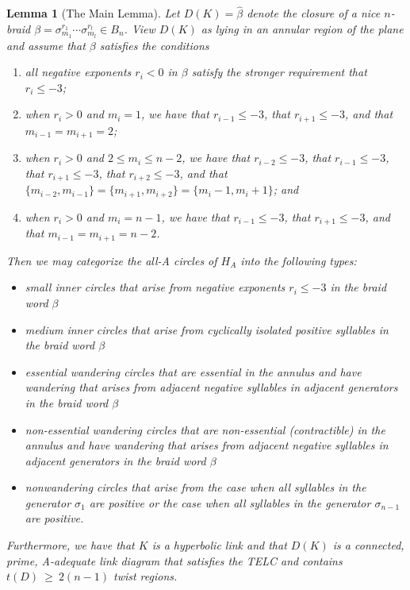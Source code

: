 \documentclass{article}
\newtheorem{lemma}{Lemma}[section]
\begin{document}
\begin{lemma}[The Main Lemma] 
\label{setup}
Let $D(K)=\widehat{\beta}$ denote the closure of a nice $n$-braid $\beta=\sigma_{m_{1}}^{r_{1}}\cdots\sigma_{m_{l}}^{r_{l}} \in B_{n}$. View $D(K)$ as lying in an annular region of the plane and assume that $\beta$ satisfies the conditions
\begin{enumerate}   
\item[(1)] all negative exponents $r_{i}<0$ in $\beta$ satisfy the stronger requirement that $r_{i}\leq-3$;
\item[(2a)] when $r_{i}>0$ and $m_{i}=1$, we have that $r_{i-1} \leq -3$, that $r_{i+1} \leq -3$, and that $m_{i-1}=m_{i+1}=2$; 
\item[(2b)] when $r_{i}>0$ and $2 \leq m_{i} \leq n-2$, we have that $r_{i-2} \leq -3$, that $r_{i-1} \leq -3$, that $r_{i+1} \leq -3$, that $r_{i+2} \leq -3$, and that $\{m_{i-2}, m_{i-1}\}=\{m_{i+1}, m_{i+2}\}=\{m_{i}-1, m_{i}+1\}$; and
\item[(2c)] when $r_{i}>0$ and $m_{i}=n-1$, we have that $r_{i-1} \leq -3$, that $r_{i+1} \leq -3$, and that $m_{i-1}=m_{i+1}=n-2$. 
\end{enumerate}
Then we may categorize the all-A circles of $H_{A}$ into the following types:
\begin{itemize}
\item \emph{small inner circles} that arise from negative exponents $r_{i}\leq-3$ in the braid word $\beta$
\item \emph{medium inner circles} that arise from cyclically isolated positive syllables in the braid word $\beta$ 
\item \emph{essential wandering circles} that are essential in the annulus and have wandering that arises from adjacent negative syllables in adjacent generators in the braid word $\beta$ 
\item \emph{non-essential wandering circles} that are non-essential (contractible) in the annulus and have wandering that arises from adjacent negative syllables in adjacent generators in the braid word $\beta$  
\item \emph{nonwandering circles} that arise from the case when all syllables in the generator $\sigma_{1}$ are positive or the case when all syllables in the generator $\sigma_{n-1}$ are positive.
\end{itemize}
\noindent Furthermore, we have that $K$ is a hyperbolic link and that $D(K)$ is a connected, prime, A-adequate link diagram that satisfies the TELC and contains $t(D)~\geq~2(n-1)$ twist regions.    
\end{lemma}
\end{document}
